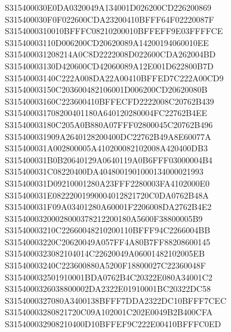 \documentclass[12pt,a4paper]{article}
\begin{document}
\begin{framed}
{S315400030E0DA0320049A134001D026200CD226200869\newline
S315400030F0F022600CDA23200410BFFF64F02220087F\newline
S3154000310010BFFFC08210200010BFFEFF9E03FFFFCE\newline
S31540003110D006200CD20620089A14200194060010EE\newline
S315400031208214A0C8D2222008D022600CDA262004BD\newline
S31540003130D420600CD42060089A12E001D622800B7D\newline
S31540003140C222A008DA22A00410BFFED7C222A00CD9\newline
S31540003150C203600482106001D006200CD20620080B\newline
S31540003160C223600410BFFECFD2222008C20762B439\newline
S315400031708200401180A640120280004FC22762B4EE\newline
S31540003180C205A0B880A07FFF02800045C20762B496\newline
S315400031909A2640128200400DC22762B49A8E60077A\newline
S315400031A002800005A410200082102008A420400DB3\newline
S315400031B0B20640129A0640119A0B6FFF03000004B4\newline
S315400031C08220400DA4048001901000134000021993\newline
S315400031D09210001280A23FFF2280003FA4102000E0\newline
S315400031E08222001990004012821720C0DA0762B48A\newline
S315400031F09A03401280A60001F2206008DA2762B4E2\newline
S31540003200028000378212200180A5600F38800005B9\newline
S31540003210C22660048210200110BFFF94C2266004BB\newline
S31540003220C20620049A057FF4A80B7FF88208600145\newline
S3154000323082104014C22620049A06001482102005EB\newline
S31540003240C223600880A5200F18800027C22360048F\newline
S315400032501910001BDA0762B4C20322E080A34001C2\newline
S3154000326038800002DA2322E01910001BC20322DC58\newline
S3154000327080A3400138BFFF7DDA2322DC10BFFF7CEC\newline
S31540003280821720C09A102001C202E0049B2B400CFA\newline
S315400032908210400D10BFFEF9C222E00410BFFFC0ED\newline
}
\end{framed}
\end{document}
